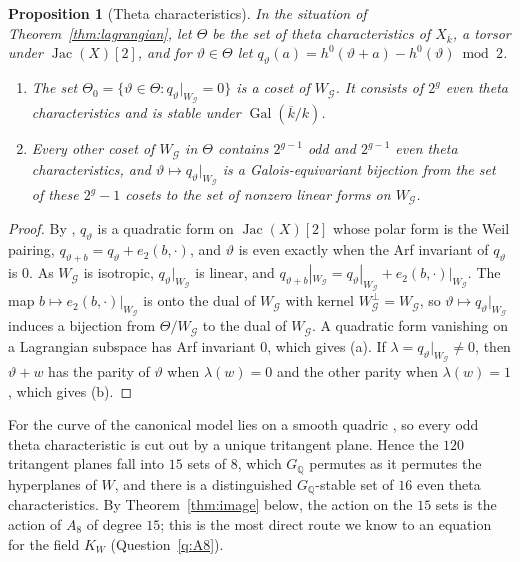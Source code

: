 \documentclass[11pt]{amsart}
\newtheorem{proposition}[theorem]{Proposition}
\theoremstyle{definition}
\newcommand{\QQ}{\mathbb{Q}}
\newcommand{\kbar}{\overline{k}}
\newcommand{\Gal}{\operatorname{Gal}}
\newcommand{\Jac}{\operatorname{Jac}}
\newcommand{\cG}{\mathcal{G}}
\newcommand{\GQ}{G_{\QQ}}
\begin{document}
\begin{proposition}[Theta characteristics]\label{prop:theta}
In the situation of Theorem~\ref{thm:lagrangian}, let $\Theta$ be the set of theta characteristics of $X_{\kbar}$, a torsor under $\Jac(X)[2]$, and for $\vartheta\in\Theta$ let $q_\vartheta(a)=h^0(\vartheta+a)-h^0(\vartheta)\bmod2$.
\begin{enumerate}[label=\textup{(\alph*)}]
\item The set $\Theta_0=\{\vartheta\in\Theta: q_\vartheta|_{W_\cG}=0\}$ is a coset of $W_\cG$. It consists of $2^g$ even theta characteristics and is stable under $\Gal(\kbar/k)$.
\item Every other coset of $W_\cG$ in $\Theta$ contains $2^{g-1}$ odd and $2^{g-1}$ even theta characteristics, and $\vartheta\mapsto q_\vartheta|_{W_\cG}$ is a Galois-equivariant bijection from the set of these $2^g-1$ cosets to the set of nonzero linear forms on $W_\cG$.
\end{enumerate}
\end{proposition}
\begin{proof}
By \cite{Mumford71}, $q_\vartheta$ is a quadratic form on $\Jac(X)[2]$ whose polar form is the Weil pairing, $q_{\vartheta+b}=q_\vartheta+e_2(b,\cdot)$, and $\vartheta$ is even exactly when the Arf invariant of $q_\vartheta$ is $0$. As $W_\cG$ is isotropic, $q_\vartheta|_{W_\cG}$ is linear, and $q_{\vartheta+b}|_{W_\cG}=q_\vartheta|_{W_\cG}+e_2(b,\cdot)|_{W_\cG}$. The map $b\mapsto e_2(b,\cdot)|_{W_\cG}$ is onto the dual of $W_\cG$ with kernel $W_\cG^\perp=W_\cG$, so $\vartheta\mapsto q_\vartheta|_{W_\cG}$ induces a bijection from $\Theta/W_\cG$ to the dual of $W_\cG$. A quadratic form vanishing on a Lagrangian subspace has Arf invariant $0$, which gives (a). If $\lambda=q_\vartheta|_{W_\cG}\ne0$, then $\vartheta+w$ has the parity of $\vartheta$ when $\lambda(w)=0$ and the other parity when $\lambda(w)=1$, which gives (b).
\end{proof}

For the curve of \cite{HJLPPZ26} the canonical model lies on a smooth quadric \cite[Prop.~8.22]{LeLay26}, so every odd theta characteristic is cut out by a unique tritangent plane. Hence the $120$ tritangent planes fall into $15$ sets of $8$, which $\GQ$ permutes as it permutes the hyperplanes of $W$, and there is a distinguished $\GQ$-stable set of $16$ even theta characteristics. By Theorem~\ref{thm:image} below, the action on the $15$ sets is the action of $A_8$ of degree $15$; this is the most direct route we know to an equation for the field $K_W$ (Question~\ref{q:A8}).
\end{document}
